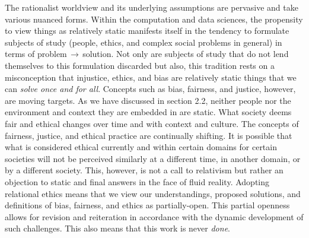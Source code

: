 The rationalist worldview and its underlying assumptions are pervasive and take various nuanced forms. Within the computation and data sciences, the propensity to view things as relatively static manifests itself in the tendency to formulate subjects of study (people, ethics, and complex social problems in general) in terms of problem$\,\to\,$solution. Not only are subjects of study that do not lend themselves to this formulation discarded but also, this tradition rests on a misconception that injustice, ethics, and bias are relatively static things that we can \textit{solve once and for all}. Concepts such as bias, fairness, and justice, however, are moving targets. As we have discussed in section 2.2, neither people nor the environment and context they are embedded in are static. What society deems fair and ethical changes over time and with context and culture. The concepts of fairness, justice, and ethical practice are continually shifting. It is possible that what is considered ethical currently and within certain domains for certain societies will not be perceived similarly at a different time, in another domain, or by a different society. This, however, is not a call to relativism but rather an objection to static and final answers in the face of fluid reality. Adopting relational ethics means that we view our understandings, proposed solutions, and definitions of bias, fairness, and ethics as partially-open. This partial openness allows for revision and reiteration in accordance with the dynamic development of such challenges. This also means that this work is never \textit{done}.  


